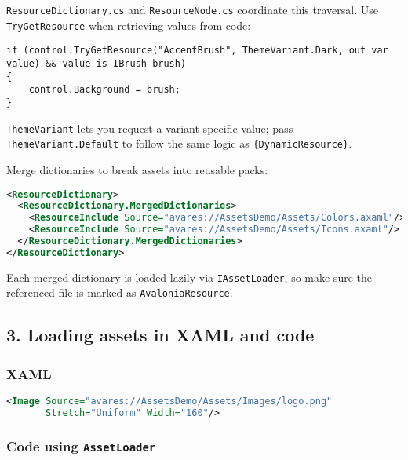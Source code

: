 \passthrough{\lstinline!ResourceDictionary.cs!} and
\passthrough{\lstinline!ResourceNode.cs!} coordinate this traversal. Use
\passthrough{\lstinline!TryGetResource!} when retrieving values from
code:

\begin{lstlisting}
if (control.TryGetResource("AccentBrush", ThemeVariant.Dark, out var value) && value is IBrush brush)
{
    control.Background = brush;
}
\end{lstlisting}

\passthrough{\lstinline!ThemeVariant!} lets you request a
variant-specific value; pass
\passthrough{\lstinline!ThemeVariant.Default!} to follow the same logic
as \passthrough{\lstinline!\{DynamicResource\}!}.

Merge dictionaries to break assets into reusable packs:

\begin{lstlisting}[language=XML]
<ResourceDictionary>
  <ResourceDictionary.MergedDictionaries>
    <ResourceInclude Source="avares://AssetsDemo/Assets/Colors.axaml"/>
    <ResourceInclude Source="avares://AssetsDemo/Assets/Icons.axaml"/>
  </ResourceDictionary.MergedDictionaries>
</ResourceDictionary>
\end{lstlisting}

Each merged dictionary is loaded lazily via
\passthrough{\lstinline!IAssetLoader!}, so make sure the referenced file
is marked as \passthrough{\lstinline!AvaloniaResource!}.

\subsection{3. Loading assets in XAML and
code}\label{loading-assets-in-xaml-and-code}

\subsubsection{XAML}\label{xaml}

\begin{lstlisting}[language=XML]
<Image Source="avares://AssetsDemo/Assets/Images/logo.png"
       Stretch="Uniform" Width="160"/>
\end{lstlisting}

\subsubsection{\texorpdfstring{Code using
\texttt{AssetLoader}}{Code using AssetLoader}}\label{code-using-assetloader}

